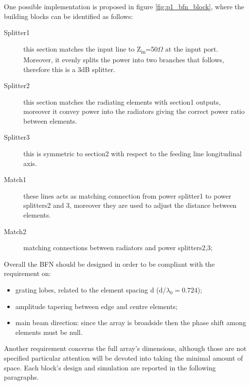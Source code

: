 One possible implementation is proposed in figure \ref{fig:p1_bfn_block}, where the building blocks can be identified as follows: 
\begin{description}
	\item [Splitter1] this section matches the input line to Z\textsubscript{in}=50$\Omega$ at the input port. Moreover, it evenly splits the power into two branches that follows, therefore this is a 3dB splitter. 
	\item [Splitter2] this section matches the radiating elements with section1 outputs, moreover it convey power into the radiators giving the correct power ratio between elements.
	\item [Splitter3] this is symmetric to section2 with respect to the feeding line longitudinal axis. 
	\item [Match1] these lines acts as matching connection from power splitter1 to power splitters2 and 3, moreover they are used to adjust the distance between elements.
	\item [Match2] matching connections between radiators and power splitters2,3;
\end{description}
Overall the BFN should be designed in order to be compliant with the requirement on:
\begin{itemize}
	\item grating lobes, related to the element spacing d (d/$\lambda_0=0.724$);
	\item amplitude tapering between edge and centre elements;
	\item main beam direction: since the array is broadside then the phase shift among elements must be null.
\end{itemize}
Another requirement concerns the full array's dimensions, although those are not specified particular attention will be devoted into taking the minimal amount of space.
Each block's design and simulation are reported in the following paragraphs.

